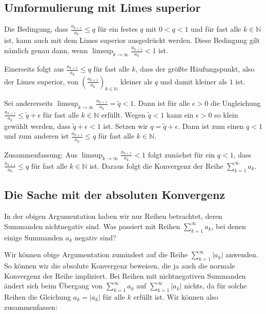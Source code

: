 \documentclass[fontsize=9pt,
               parskip=half-,
               DIV=14,
               listof=chapterentry,
               tocflat]{scrbook}
\begin{document}
\subsection{Umformulierung mit Limes superior}

Die Bedingung, dass ${\tfrac {a_{k+1}}{a_{k}}}\leq q$ für ein festes $q$ mit $0<q<1$ und für fast alle $k\in \mathbb {N} $ ist, kann auch mit dem Limes superior ausgedrückt werden. Diese Bedingung gilt nämlich genau dann, wenn $\limsup _{k\to \infty }{\tfrac {a_{k+1}}{a_{k}}}<1$ ist.

Einerseits folgt aus ${\tfrac {a_{k+1}}{a_{k}}}\leq q$ für fast alle $k$, dass der größte Häufungspunkt, also der Limes superior, von $\left({\tfrac {a_{k+1}}{a_{k}}}\right)_{k\in \mathbb {N} }$ kleiner als $q$ und damit kleiner als $1$ ist.

Sei andererseits $\limsup _{k\to \infty }{\tfrac {a_{k+1}}{a_{k}}}={\tilde {q}}<1$. Dann ist für alle $\epsilon >0$ die Ungleichung ${\tfrac {a_{k+1}}{a_{k}}}\leq {\tilde {q}}+\epsilon $ für fast alle $k\in \mathbb {N} $ erfüllt. Wegen ${\tilde {q}}<1$ kann ein $\epsilon >0$ so klein gewählt werden, dass ${\tilde {q}}+\epsilon <1$ ist. Setzen wir $q={\tilde {q}}+\epsilon $. Dann ist zum einen $q<1$ und zum anderen ist ${\tfrac {a_{k+1}}{a_{k}}}\leq q$ für fast alle $k\in \mathbb {N} $.

Zusammenfassung: Aus $\limsup _{k\to \infty }{\tfrac {a_{k+1}}{a_{k}}}<1$ folgt zunächst für ein $q<1$, dass ${\tfrac {a_{k+1}}{a_{k}}}\leq q$ für fast alle $k\in \mathbb {N} $ ist. Daraus folgt die Konvergenz der Reihe $\sum _{k=1}^{\infty }a_{k}$.

\subsection{Die Sache mit der absoluten Konvergenz}

In der obigen Argumentation haben wir nur Reihen betrachtet, deren Summanden nichtnegativ sind. Was passiert mit Reihen $\sum _{k=1}^{\infty }a_{k}$, bei denen einige Summanden $a_{k}$ negativ sind?

Wir können obige Argumentation zumindest auf die Reihe $\sum _{k=1}^{\infty }|a_{k}|$ anwenden. So können wir die absolute Konvergenz beweisen, die ja auch die normale Konvergenz der Reihe impliziert. Bei Reihen mit nichtnegativen Summanden ändert sich beim Übergang von $\sum _{k=1}^{\infty }a_{k}$ auf $\sum _{k=1}^{\infty }|a_{k}|$ nichts, da für solche Reihen die Gleichung $a_{k}=|a_{k}|$ für alle $k$ erfüllt ist. Wir können also zusammenfassen:
\end{document}
